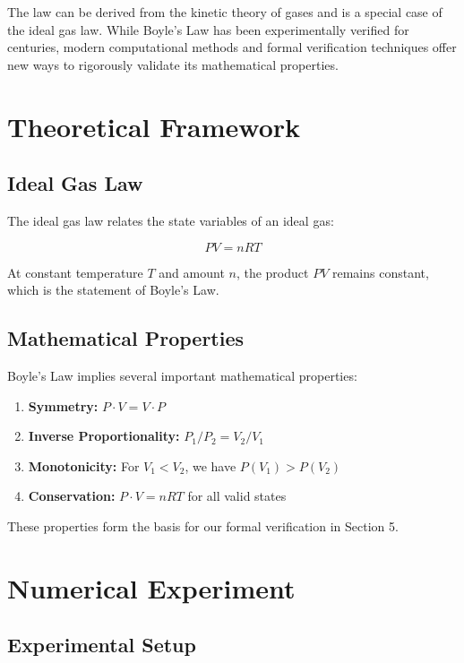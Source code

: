 \documentclass{article}
\theoremstyle{plain}
\theoremstyle{definition}
\theoremstyle{remark}
\begin{document}
The law can be derived from the kinetic theory of gases and is a special case of the ideal gas law. While Boyle's Law has been experimentally verified for centuries, modern computational methods and formal verification techniques offer new ways to rigorously validate its mathematical properties.

\section{Theoretical Framework}

\subsection{Ideal Gas Law}

The ideal gas law relates the state variables of an ideal gas:

\begin{equation}
  PV = nRT
\end{equation}

At constant temperature $T$ and amount $n$, the product $PV$ remains constant, which is the statement of Boyle's Law.

\subsection{Mathematical Properties}

Boyle's Law implies several important mathematical properties:

\begin{enumerate}
  \item \textbf{Symmetry:} $P \cdot V = V \cdot P$
  \item \textbf{Inverse Proportionality:} $P_1/P_2 = V_2/V_1$
  \item \textbf{Monotonicity:} For $V_1 < V_2$, we have $P(V_1) > P(V_2)$
  \item \textbf{Conservation:} $P \cdot V = nRT$ for all valid states
\end{enumerate}

These properties form the basis for our formal verification in Section 5.

\section{Numerical Experiment}

\subsection{Experimental Setup}
\end{document}

